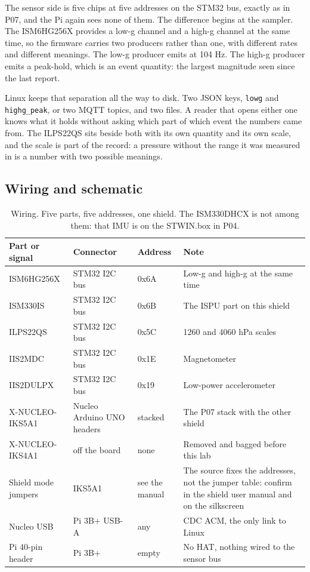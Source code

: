 The sensor side is five chips at five addresses on the STM32 bus, exactly as in P07, and
the Pi again sees none of them. The difference begins at the sampler. The ISM6HG256X
provides a low-g channel and a high-g channel at the same time, so the firmware carries
two producers rather than one, with different rates and different meanings. The low-g
producer emits at 104 Hz. The high-g producer emits a peak-hold, which is an event
quantity: the largest magnitude seen since the last report.

Linux keeps that separation all the way to disk. Two JSON keys, \texttt{lowg} and
\texttt{highg\_peak}, or two MQTT topics, and two files. A reader that opens either one
knows what it holds without asking which part of which event the numbers came from. The
ILPS22QS sits beside both with its own quantity and its own scale, and the scale is part
of the record: a pressure without the range it was measured in is a number with two
possible meanings.

\subsection*{Wiring and schematic}


\begin{table}[H]\centering\small
\begin{tabular}{p{38mm}p{30mm}p{20mm}p{60mm}}
\toprule
Part or signal & Connector & Address & Note \\
\midrule
ISM6HG256X & STM32 I2C bus & 0x6A & Low-g and high-g at the same time \\
ISM330IS & STM32 I2C bus & 0x6B & The ISPU part on this shield \\
ILPS22QS & STM32 I2C bus & 0x5C & 1260 and 4060 hPa scales \\
IIS2MDC & STM32 I2C bus & 0x1E & Magnetometer \\
IIS2DULPX & STM32 I2C bus & 0x19 & Low-power accelerometer \\
X-NUCLEO-IKS5A1 & Nucleo Arduino UNO headers & stacked & The P07 stack with the other shield \\
X-NUCLEO-IKS4A1 & off the board & none & Removed and bagged before this lab \\
Shield mode jumpers & IKS5A1 & see the manual & The source fixes the addresses, not the jumper table: confirm in the shield user manual and on the silkscreen \\
Nucleo USB & Pi 3B+ USB-A & any & CDC ACM, the only link to Linux \\
Pi 40-pin header & Pi 3B+ & empty & No HAT, nothing wired to the sensor bus \\
\bottomrule
\end{tabular}
\caption{Wiring. Five parts, five addresses, one shield. The ISM330DHCX is not among them:
that IMU is on the STWIN.box in P04.}
\end{table}

